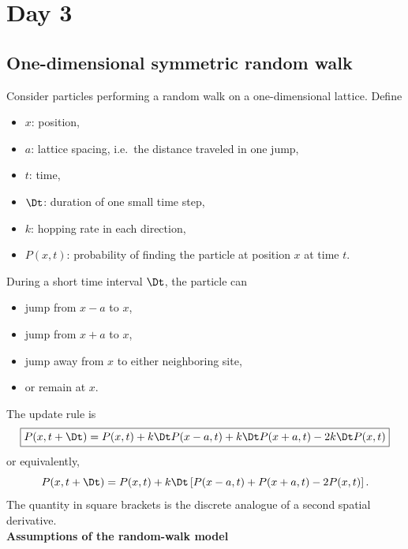 \section{Day 3}

\subsection{One-dimensional symmetric random walk}

Consider particles performing a random walk on a one-dimensional lattice.
Define
\begin{itemize}
    \item $x$: position,
    \item $a$: lattice spacing, i.e.\ the distance traveled in one jump,
    \item $t$: time,
    \item $\Dt$: duration of one small time step,
    \item $k$: hopping rate in each direction,
    \item $P(x,t)$: probability of finding the particle at position $x$ at time $t$.
\end{itemize}

During a short time interval $\Dt$, the particle can
\begin{itemize}
    \item jump from $x-a$ to $x$,
    \item jump from $x+a$ to $x$,
    \item jump away from $x$ to either neighboring site,
    \item or remain at $x$.
\end{itemize}

The update rule is
\[
    \boxed{
        P(x,t+\Dt) = P(x,t) + k\Dt P(x-a,t) + k\Dt P(x+a,t) - 2k\Dt P(x,t)
    }
\]
or equivalently,
\[
    P(x,t+\Dt) = P(x,t) + k\Dt \left[ P(x-a,t) + P(x+a,t) - 2P(x,t) \right].
\]
The quantity in square brackets is the discrete analogue of a second spatial derivative.
% 
% 
\medskip
\\
\textbf{Assumptions of the random-walk model}

